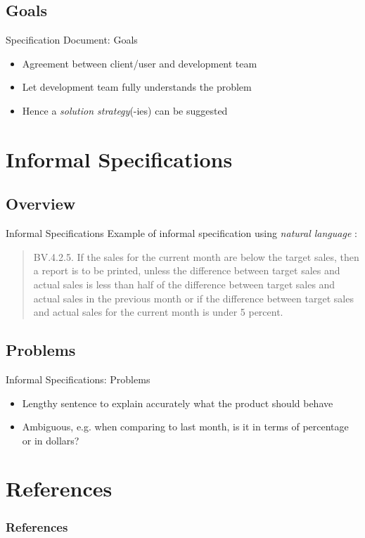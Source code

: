 \documentclass{beamer}
\begin{document}
	\subsection{Goals}
	\begin{frame}{Specification Document: Goals}
		\begin{itemize}
			\item Agreement between client/user and development team
			\item Let development team fully understands the problem
			\item Hence a \textit{solution strategy}(-ies) can be suggested
		\end{itemize}
	\end{frame}

	\section{Informal Specifications}
	\subsection{Overview}
	\begin{frame}{Informal Specifications}
		Example of informal specification using \textit{natural language} \cite[page 462]{Schach:2006:OCS:1207045}:
		\begin{quotation}
		BV.4.2.5. If the sales for the current month are below the target sales, then a report is to be printed, unless the difference between target sales and actual sales is less than half of the difference between target sales and actual sales in the previous month or if the difference between target sales and actual sales for the current month is under 5 percent.
	\end{quotation}
	\end{frame}
	\subsection{Problems}
	\begin{frame}{Informal Specifications: Problems}
		\begin{itemize}
			\item Lengthy sentence to explain accurately what the product should behave
			\item Ambiguous, e.g. when comparing to last month, is it in terms of percentage or in dollars?
		\end{itemize}
	\end{frame}	
	
	\section{References}
	\begin{frame}[allowframebreaks]
	        \frametitle{References}
	        
	        
	\end{frame}
\end{document}
